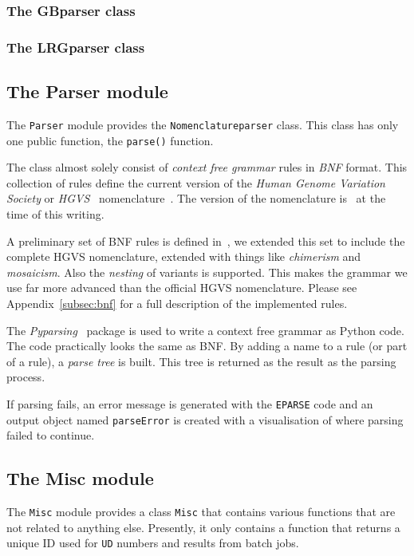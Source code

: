 \documentclass{article}
\begin{document}
\subsubsection{The GBparser class} \label{subsubsec:gbparser}

\subsubsection{The LRGparser class} \label{subsubsec:lrgparser}

\subsection{The Parser module} \label{subsec:parser}
The \texttt{Parser} module provides the \texttt{Nomenclatureparser} class. This
class has only one public function, the \texttt{parse()} function.

The class almost solely consist of \emph{context free grammar} rules in
\emph{BNF} format. This collection of rules define the current version of the
\emph{Human Genome Variation Society} or \emph{HGVS}~\cite{HGVS}
nomenclature~\cite{NOM1, NOM2, NOM3, NOM4, NOM5, NOM6, NOM7}. The version of
the nomenclature is \nomenclatureversion\ at the time of this writing.

A preliminary set of BNF rules is defined in~\cite{BNF}, we extended this set
to include the complete HGVS nomenclature, extended with things like
\emph{chimerism} and \emph{mosaicism}. Also the \emph{nesting} of variants is
supported. This makes the grammar we use far more advanced than the official
HGVS nomenclature. Please see Appendix~\ref{subsec:bnf} for a full description
of the implemented rules.

The \emph{Pyparsing}~\cite{PYPARSING} package is used to write a context free
grammar as Python code. The code practically looks the same as BNF. By adding a
name to a rule (or part of a rule), a \emph{parse tree} is built. This tree is
returned as the result as the parsing process.

If parsing fails, an error message is generated with the \texttt{EPARSE} code
and an output object named \texttt{parseError} is created with a visualisation
of where parsing failed to continue.

\subsection{The Misc module} \label{subsec:misc}
The \texttt{Misc} module provides a class \texttt{Misc} that contains various
functions that are not related to anything else. Presently, it only contains
a function that returns a unique ID used for \texttt{UD} numbers and results
from batch jobs.
\end{document}
